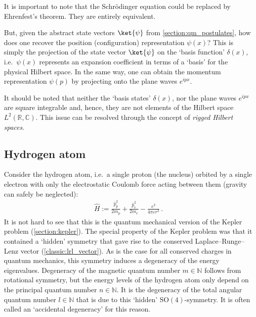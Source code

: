     \begin{remark}[Equivalence]
        It is important to note that the Schr\"odinger equation could be replaced by Ehrenfest's theorem. They are entirely equivalent.
    \end{remark}

    But, given the abstract state vectors $\ket{\psi}$ from \cref{section:qm_postulates}, how does one recover the position (configuration) representation $\psi(x)$? This is simply the projection of the state vector $\ket{\psi}$ on the `basis function' $\delta(x)$, i.e.~$\psi(x)$ represents an expansion coefficient in terms of a `basis' for the physical Hilbert space. In the same way, one can obtain the momentum representation $\psi(p)$ by projecting onto the plane waves $e^{ipx}$.

    \begin{remark}
        It should be noted that neither the `basis states' $\delta(x)$, nor the plane waves $e^{ipx}$ are square integrable and, hence, they are not elements of the Hilbert space $L^2(\mathbb{R},\mathbb{C})$. This issue can be resolved through the concept of \textit{rigged Hilbert spaces}.
    \end{remark}


\subsection{Hydrogen atom}

    Consider the hydrogen atom, i.e.~a single proton (the nucleus) orbited by a single electron with only the electrostatic Coulomb force acting between them (gravity can safely be neglected):
    \begin{gather}
        \widehat{H} := \frac{\widehat{p}_p^2}{2m_p} + \frac{\widehat{p}_e^2}{2m_e} - \frac{e^2}{4\pi\varepsilon r^2}\,.
    \end{gather}
    It is not hard to see that this is the quantum mechanical version of the Kepler problem (\cref{section:kepler}). The special property of the Kepler problem was that it contained a `hidden' symmetry that gave rise to the conserved Laplace--Runge--Lenz vector (\cref{classic:lrl_vector}). As is the case for all conserved charges in quantum mechanics, this symmetry induces a degeneracy of the energy eigenvalues. Degeneracy of the magnetic quantum number $m\in\mathbb{N}$ follows from rotational symmetry, but the energy levels of the hydrogen atom only depend on the principal quantum number $n\in\mathbb{N}$. It is the degeneracy of the total angular quantum number $l\in\mathbb{N}$ that is due to this `hidden' $\mathrm{SO}(4)$-symmetry. It is often called an `accidental degeneracy' for this reason.

